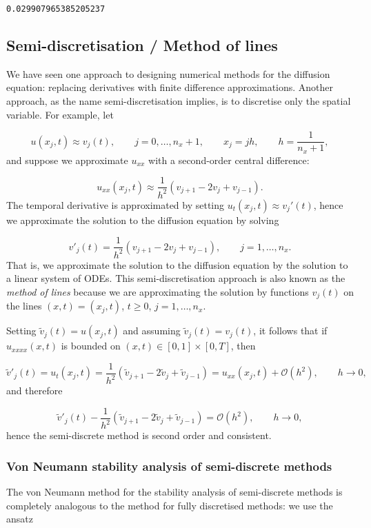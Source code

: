\documentclass[12pt,a4paper]{article}
\begin{document}
\begin{lstlisting}
0.029907965385205237
\end{lstlisting}


\subsection{Semi-discretisation / Method of lines}
We have seen one approach to designing numerical methods for the diffusion equation: replacing derivatives with finite difference approximations.  Another approach, as the name semi-discretisation implies, is to discretise only the spatial variable.   For example, let

\[
u(x_j,t) \approx v_j(t), \qquad j  = 0, \ldots, n_x + 1, \qquad x_j = jh, \qquad h = \frac{1}{n_x + 1},
\]
and suppose we approximate $u_{xx}$ with a second-order central difference:

\[
u_{xx}(x_j,t) \approx  \frac{1}{h^2}\left(v_{j+1} - 2v_j + v_{j-1}   \right).
\]
The temporal derivative is approximated by setting $u_t(x_j,t) \approx v_j'(t)$,  hence we approximate the solution to the diffusion equation by solving

\[
v'_j(t) = \frac{1}{h^2}\left(v_{j+1} - 2v_j + v_{j-1}   \right), \qquad j  = 1, \ldots, n_x.
\]
That is, we approximate the solution to the diffusion equation by the solution to a linear system of ODEs.   This semi-discretisation approach is also known as the \emph{method of lines} because we are approximating the solution by functions $v_j(t)$ on the lines $(x,t) = (x_j,t)$, $t \geq 0$, $j = 1, \ldots, n_x$.

Setting $\tilde{v}_j(t) = u(x_j,t)$ and assuming $\tilde{v}_j(t) = v_j(t)$, it follows that if $u_{xxxx}(x,t)$ is bounded on $(x,t) \in [0,1]\times[0,T]$, then

\[
\tilde{v}'_j(t) = u_t(x_j,t) = \frac{1}{h^2}\left(\tilde{v}_{j+1} - 2\tilde{v}_j + \tilde{v}_{j-1}   \right) = u_{xx}(x_j,t) + \mathcal{O}(h^2), \qquad h \to 0,
\]
and therefore

\[
\tilde{v}'_j(t) - \frac{1}{h^2}\left(\tilde{v}_{j+1} - 2\tilde{v}_j + \tilde{v}_{j-1}   \right) = \mathcal{O}(h^2), \qquad h \to 0,
\]
hence the semi-discrete method is second order and consistent.

\subsubsection{Von Neumann stability analysis of semi-discrete methods}
The von Neumann method for the stability analysis of semi-discrete methods is completely analogous to the method for fully discretised methods: we use the ansatz
\end{document}
